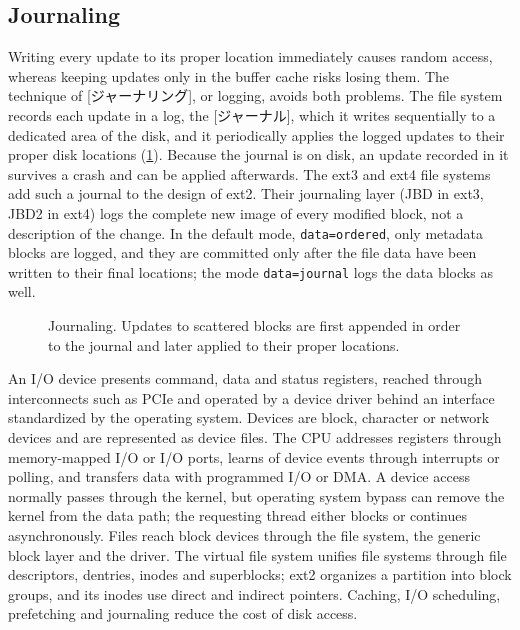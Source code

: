 \documentclass[../main.tex]{subfiles}
\begin{document}
\subsection{Journaling}

Writing every update to its proper location immediately causes random
access, whereas keeping updates only in the buffer cache risks losing them.
The technique of [ジャーナリング], or logging, avoids both
problems.  The file system records each update in a log, the
[ジャーナル], which it writes sequentially to a dedicated area
of the disk, and it periodically applies the logged updates to their proper
disk locations (\cref{fig:l11-journal}).  Because the journal is on disk, an
update recorded in it survives a crash and can be applied
afterwards.  The ext3 and ext4 file systems add such a
journal to the design of ext2.  Their journaling layer (JBD in ext3, JBD2
in ext4) logs the complete new image of every modified block, not a
description of the change.  In the default mode, \texttt{data=ordered},
only metadata blocks are logged, and they are committed only after the
file data have been written to their final locations; the mode
\texttt{data=journal} logs the data blocks as well.


\begin{figure}[htbp]
  \centering
  
  \caption{Journaling.  Updates to scattered blocks are first appended in
    order to the journal and later applied to their proper locations.}
  \label{fig:l11-journal}
\end{figure}

\begin{keypoint}
  An I/O device presents command, data and status registers, reached
  through interconnects such as PCIe and operated by a device driver behind
  an interface standardized by the operating system.  Devices are block,
  character or network devices and are represented as device files.  The
  CPU addresses registers through memory-mapped I/O or I/O ports, learns of
  device events through interrupts or polling, and transfers data with
  programmed I/O or DMA.  A device access normally passes through the
  kernel, but operating system bypass can remove the kernel from the data
  path; the requesting thread either blocks or continues asynchronously.
  Files reach block devices through the file system, the generic block layer
  and the driver.  The virtual file system unifies file systems through file
  descriptors, dentries, inodes and superblocks; ext2 organizes a partition
  into block groups, and its inodes use direct and indirect pointers.
  Caching, I/O scheduling, prefetching and journaling reduce the cost of
  disk access.
\end{keypoint}
\end{document}
